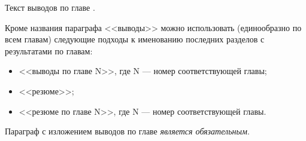 Текст выводов по главе \thechapter.

Кроме названия параграфа <<выводы>> можно использовать (единообразно по всем главам) следующие подходы к именованию последних разделов с результатами по главам:
\begin{itemize}
	\item <<выводы по главе N>>, где N --- номер соответствующей главы;
	\item <<резюме>>;
	\item <<резюме по главе N>>, где N --- номер соответствующей главы.
\end{itemize}

Параграф с изложением выводов по главе \textit{является обязательным}.

%

